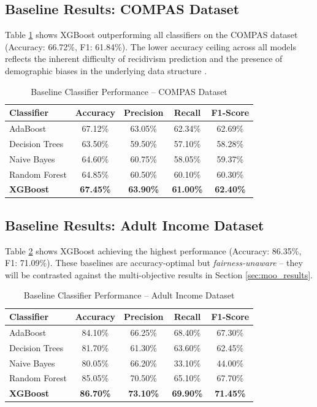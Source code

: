 \documentclass[12pt,a4paper]{article}
\begin{document}
\subsection{Baseline Results: COMPAS Dataset}

Table \ref{tab:baseline_compas} shows XGBoost outperforming all classifiers on the COMPAS dataset (Accuracy: 66.72\%, F1: 61.84\%). The lower accuracy ceiling across all models reflects the inherent difficulty of recidivism prediction and the presence of demographic biases in the underlying data structure \cite{angwin2016machine}.

\begin{table}[h]
\centering
\caption{Baseline Classifier Performance -- COMPAS Dataset}
\label{tab:baseline_compas}
\begin{tabular}{lcccc}
\toprule
\textbf{Classifier} & \textbf{Accuracy} & \textbf{Precision} & \textbf{Recall} & \textbf{F1-Score} \\
\midrule
AdaBoost        & 67.12\% & 63.05\% & 62.34\% & 62.69\% \\
Decision Trees  & 63.50\% & 59.50\% & 57.10\% & 58.28\% \\
Naive Bayes     & 64.60\% & 60.75\% & 58.05\% & 59.37\% \\
Random Forest   & 64.85\% & 60.50\% & 60.10\% & 60.30\% \\
\textbf{XGBoost} & \textbf{67.45\%} & \textbf{63.90\%} & \textbf{61.00\%} & \textbf{62.40\%} \\
\bottomrule
\end{tabular}
\end{table}

\subsection{Baseline Results: Adult Income Dataset}

Table \ref{tab:baseline_adult} shows XGBoost achieving the highest performance (Accuracy: 86.35\%, F1: 71.09\%). These baselines are accuracy-optimal but \textit{fairness-unaware} -- they will be contrasted against the multi-objective results in Section \ref{sec:moo_results}.

\begin{table}[h]
\centering
\caption{Baseline Classifier Performance -- Adult Income Dataset}
\label{tab:baseline_adult}
\begin{tabular}{lcccc}
\toprule
\textbf{Classifier} & \textbf{Accuracy} & \textbf{Precision} & \textbf{Recall} & \textbf{F1-Score} \\
\midrule
AdaBoost        & 84.10\% & 66.25\% & 68.40\% & 67.30\% \\
Decision Trees  & 81.70\% & 61.30\% & 63.60\% & 62.45\% \\
Naive Bayes     & 80.05\% & 66.20\% & 33.10\% & 44.00\% \\
Random Forest   & 85.05\% & 70.50\% & 65.10\% & 67.70\% \\
\textbf{XGBoost} & \textbf{86.70\%} & \textbf{73.10\%} & \textbf{69.90\%} & \textbf{71.45\%} \\
\bottomrule
\end{tabular}
\end{table}
\end{document}
